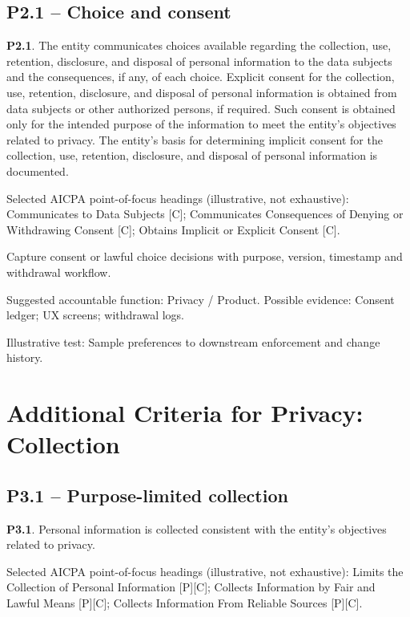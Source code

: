 \documentclass[10pt,oneside]{report}
\begin{document}
\subsection*{P2.1 -- Choice and consent}
\begin{aicpabox}
\textbf{P2.1}. The entity communicates choices available regarding the collection, use, retention, disclosure, and disposal of personal information to the data subjects and the consequences, if any, of each choice. Explicit consent for the collection, use, retention, disclosure, and disposal of personal information is obtained from data subjects or other authorized persons, if required. Such consent is obtained only for the intended purpose of the information to meet the entity's objectives related to privacy. The entity's basis for determining implicit consent for the collection, use, retention, disclosure, and disposal of personal information is documented.\par{}
\end{aicpabox}
Selected AICPA point-of-focus headings (illustrative, not exhaustive): Communicates to Data Subjects [C]; Communicates Consequences of Denying or Withdrawing Consent [C]; Obtains Implicit or Explicit Consent [C].

\begin{engineeringbox}
Capture consent or lawful choice decisions with purpose, version, timestamp and withdrawal workflow.
\end{engineeringbox}
Suggested accountable function: Privacy / Product. Possible evidence: Consent ledger; UX screens; withdrawal logs.

Illustrative test: Sample preferences to downstream enforcement and change history.

\section{Additional Criteria for Privacy: Collection}
\subsection*{P3.1 -- Purpose-limited collection}
\begin{aicpabox}
\textbf{P3.1}. Personal information is collected consistent with the entity's objectives related to privacy.\par{}
\end{aicpabox}
Selected AICPA point-of-focus headings (illustrative, not exhaustive): Limits the Collection of Personal Information [P][C]; Collects Information by Fair and Lawful Means [P][C]; Collects Information From Reliable Sources [P][C].
\end{document}
